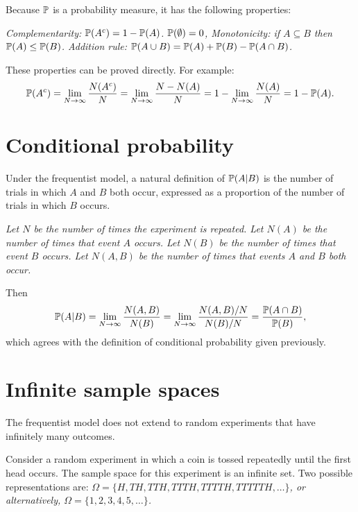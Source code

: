 \vspace*{2ex}
Because $\mathbb{P}$ is a probability measure, it has the following properties:
\begin{corollary}\label{cor:prop_freq_prob}
\ben
\it Complementarity: $\mathbb{P}(A^c) = 1 - \mathbb{P}(A)$.
\it $\mathbb{P}(\emptyset) = 0$,
\it Monotonicity: if $A\subseteq B$ then $\mathbb{P}(A)\leq \mathbb{P}(B)$.
\it Addition rule: $\mathbb{P}(A\cup B) = \mathbb{P}(A) + \mathbb{P}(B) - \mathbb{P}(A\cap B)$.
\een
\end{corollary}

\begin{remark}
These properties can be proved directly. For example:
\[
\mathbb{P}(A^c) = \lim_{N\to\infty}\frac{N(A^c)}{N}= \lim_{N\to\infty}\frac{N-N(A)}{N} = 1-\lim_{N\to\infty}\frac{N(A)}{N} = 1 - \mathbb{P}(A).
\]
\end{remark}

\section{Conditional probability}
Under the frequentist model, a natural definition of $\mathbb{P}(A|B)$ is the number of trials in which $A$ and $B$ both occur, expressed as a proportion of the number of trials in which $B$ occurs.

\bit
\it Let $N$ be the number of times the experiment is repeated. 
\it Let $N(A)$ be the number of times that event $A$ occurs. 
\it Let $N(B)$ be the number of times that event $B$ occurs. 
\it Let $N(A,B)$ be the number of times that events $A$ and $B$ both occur. 
\eit

Then
\[
\mathbb{P}(A|B)	= \lim_{N\to\infty}\frac{N(A,B)}{N(B)} 
		= \lim_{N\to\infty}\frac{N(A,B)/N}{N(B)/N} 
		= \frac{\mathbb{P}(A\cap B)}{\mathbb{P}(B)},
\]
which agrees with the definition of conditional probability given previously.
  
\newpage
\section{Infinite sample spaces}
The frequentist model does not extend to random experiments that have infinitely many outcomes.

\begin{example}\label{ex:infinitesamplespace}
Consider a random experiment in which a coin is tossed repeatedly until the first head occurs. 
The sample space for this experiment is an infinite set. Two possible representations are:
\bit
\it $\Omega = \{H,TH,TTH,TTTH,TTTTH,TTTTTH,\ldots\}$, or alternatively,
\it $\Omega = \{1,2,3,4,5,\ldots\}$.
\eit
\end{example}

